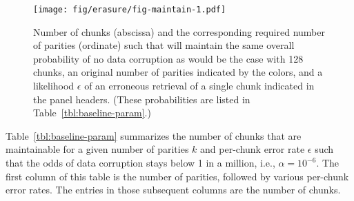 \begin{figure}[!ht]

{\centering \texttt{[image: fig/erasure/fig-maintain-1.pdf]}

}

\caption{\label{fig:maintain}Number of chunks (abscissa) and the
corresponding required number of parities (ordinate) such that will
maintain the same overall probability of no data corruption as would be
the case with 128 chunks, an original number of parities indicated by
the colors, and a likelihood \(\epsilon\) of an erroneous retrieval of a
single chunk indicated in the panel headers. (These probabilities are
listed in Table~\ref{tbl:baseline-param}.)}

\end{figure}

Table~\ref{tbl:baseline-param} summarizes the number of chunks that are
maintainable for a given number of parities \(k\) and per-chunk error
rate \(\epsilon\) such that the odds of data corruption
stays below 1 in a million, i.e., \(\alpha = 10^{-6}\). The first column of this table is the
number of parities, followed by various per-chunk error rates. The
entries in those subsequent columns are the number of chunks.

